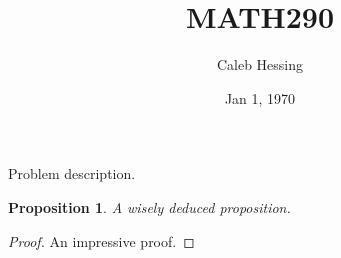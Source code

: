 \documentclass{article} %
\title{MATH290}
\author{Caleb Hessing}
\date{Jan 1, 1970}
\newtheorem{proposition}{Proposition}
\begin{document}
\maketitle

Problem description.

\begin{proposition}
    A wisely deduced proposition.
\end{proposition}

\begin{proof}\nobreakspace

    An impressive proof.

\end{proof}
\end{document}
